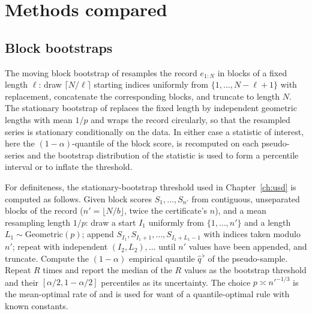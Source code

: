 
\section{Methods compared}\label{sec:usd-methods}


\subsection{Block bootstraps}

The moving block bootstrap of \cite{kunsch1989} resamples the record $e_{1:N}$ in blocks of a fixed length $\ell$: draw $\lceil N/\ell\rceil$ starting indices uniformly from $\{1,\dots,N-\ell+1\}$ with replacement, concatenate the corresponding blocks, and truncate to length $N$. The stationary bootstrap of \cite{politis1994} replaces the fixed length by independent geometric lengths with mean $1/p$ and wraps the record circularly, so that the resampled series is stationary conditionally on the data. In either case a statistic of interest, here the $(1-\alpha)$-quantile of the block score, is recomputed on each pseudo-series and the bootstrap distribution of the statistic is used to form a percentile interval or to inflate the threshold.

For definiteness, the stationary-bootstrap threshold used in Chapter~\ref{ch:usd} is computed as follows. Given block scores $S_1,\dots,S_{n'}$ from contiguous, unseparated blocks of the record ($n'=\lfloor N/b\rfloor$, twice the certificate's $n$), and a mean resampling length $1/p$: draw a start $I_1$ uniformly from $\{1,\dots,n'\}$ and a length $L_1\sim\mathrm{Geometric}(p)$; append $S_{I_1},S_{I_1+1},\dots,S_{I_1+L_1-1}$ with indices taken modulo $n'$; repeat with independent $(I_2,L_2),\dots$ until $n'$ values have been appended, and truncate. Compute the $(1-\alpha)$ empirical quantile $\hat q^{\,\flat}$ of the pseudo-sample. Repeat $R$ times and report the median of the $R$ values as the bootstrap threshold and their $[\alpha/2,1-\alpha/2]$ percentiles as its uncertainty. The choice $p\asymp n'^{-1/3}$ is the mean-optimal rate of \cite{politis1994} and is used for want of a quantile-optimal rule with known constants.


